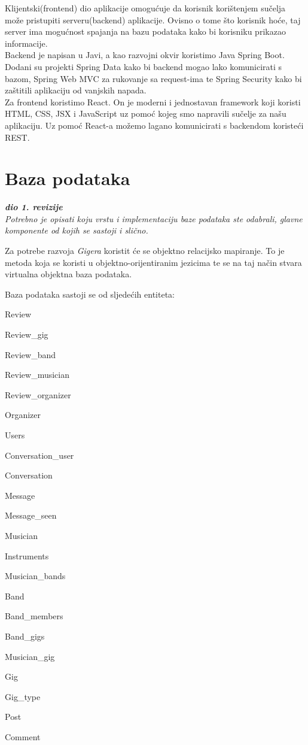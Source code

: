 	Klijentski(frontend) dio aplikacije omogućuje da korisnik korištenjem sučelja može pristupiti serveru(backend) aplikacije. Ovisno o tome što korisnik hoće, taj server ima mogućnost spajanja na bazu podataka kako bi korisniku prikazao informacije.\\

	Backend je napisan u Javi, a kao razvojni okvir koristimo Java Spring Boot. Dodani su projekti Spring Data kako bi backend mogao lako komunicirati s bazom, Spring Web MVC za rukovanje sa request-ima te Spring Security kako bi zaštitili aplikaciju od vanjskih napada. \\

	Za frontend koristimo React. On je moderni i jednostavan framework koji koristi HTML, CSS, JSX i JavaScript uz pomoć kojeg smo napravili sučelje za našu aplikaciju. Uz pomoć React-a možemo lagano komunicirati s backendom koristeći REST.\\
	
				
		\section{Baza podataka}
			
			\textbf{\textit{dio 1. revizije}}\\
			
		\textit{Potrebno je opisati koju vrstu i implementaciju baze podataka ste odabrali, glavne komponente od kojih se sastoji i slično.}
		
		Za potrebe razvoja \textit{Gigera} koristit će se objektno relacijsko mapiranje. To je metoda koja se koristi u objektno-orijentiranim jezicima te se na taj način stvara virtualna objektna baza podataka.
		
		Baza podataka sastoji se od sljedećih entiteta:
		
		\begin{packed_item}
			\item Review
			\item Review\_gig
			\item Review\_band
			\item Review\_musician
			\item Review\_organizer
			\item Organizer
			\item Users
			\item Conversation\_user
			\item Conversation
			\item Message
			\item Message\_seen
			\item Musician
			\item Instruments
			\item Musician\_bands
			\item Band
			\item Band\_members
			\item Band\_gigs
			\item Musician\_gig
			\item Gig
			\item Gig\_type
			\item Post
			\item Comment
		\end{packed_item}
			
